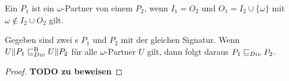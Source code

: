 \begin{Def}
  Ein \MEIO{} $P_1$ ist ein $\omega$-Partner von einem \MEIO{} $P_2$, wenn
  $I_1=O_2$ und $O_1=I_2\cup\{\omega\}$ mit $\omega\notin I_2\cup O_2$ gilt.
\end{Def}

\begin{Lem}
  Gegeben sind zwei \MEIO{}s $P_1$ und $P_2$ mit der gleichen Signatur. Wenn
  $U\|P_1 \sqsubseteq  _{Div}^\mathrm{B} U\|P_2$ für alle $\omega$-Partner $U$ gilt, dann folgt daraus
  $P_1 \sqsubseteq  _{Div} P_2$.
\end{Lem}

\begin{proof}
  \textbf{TODO zu beweisen}
\end{proof}
